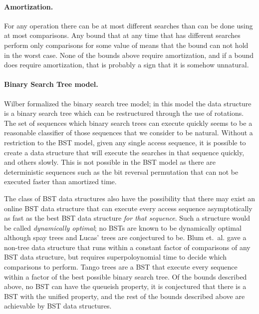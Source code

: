 \documentclass{llncs}
\begin{document}
\paragraph{Amortization.} For any operation there can be at most  different searches than can be done using at most  comparisons. Any bound that at any time that has  different searches perform only  comparisons for some value of  means that the bound can not hold in the worst case. None of the bounds above require amortization, and if a bound does require amortization, that is probably a sign that it is somehow unnatural.

\paragraph{Binary Search Tree model.} Wilber \cite{DBLP:journals/siamcomp/Wilber89} formalized the binary search tree model; in this model the data structure is a binary search tree which can be restructured through the use of rotations. The set of sequences which binary search trees can execute quickly seems to be a reasonable classifier of those sequences that we consider to be natural. Without a restriction to the BST model, given any single access sequence, it is possible to create a data structure that will execute the searches in that sequence quickly, and others slowly. This is not possible in the BST model as there are deterministic sequences such as the bit reversal permutation that can not be executed faster than  amortized time.

The class of BST data structures also have the possibility that there may exist an online BST data structure that can execute every access sequence asymptotically as fast as the best BST data structure \emph{for that sequence}. Such a structure would be called \emph{dynamically optimal}; no BSTs are known to be dynamically optimal although spay trees and Lucas' trees \cite{lucas} are conjectured to be. Blum et.~al. \cite{blum} gave a non-tree data structure that runs within a constant factor of comparisons of any BST data structure, but requires superpoloynomial time to decide which comparisons to perform. Tango trees \cite{DBLP:journals/siamcomp/DemaineHIP07} are a BST that execute every sequence within a  factor of the best possible binary search tree. Of the bounds described above, no BST can have the queueish property, it is conjectured that there is a BST with the unified property, and the rest of the bounds described above are achievable by BST data structures.
\end{document}
